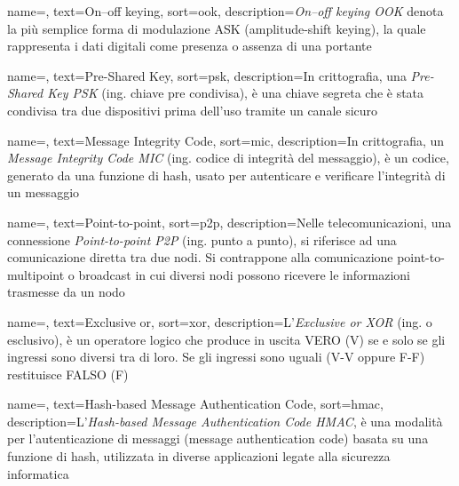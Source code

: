  {
    name=,
    text=On–off keying,
    sort=ook,
    description={\emph{On–off keying OOK} denota la più semplice forma di modulazione ASK (amplitude-shift keying), la quale rappresenta i dati digitali come presenza o assenza di una portante}
}

 {
    name=,
    text=Pre-Shared Key,
    sort=psk,
    description={In crittografia, una \emph{Pre-Shared Key PSK} (ing. chiave pre condivisa), è una chiave segreta che è stata condivisa tra due dispositivi prima dell'uso tramite un canale sicuro}
}

 {
    name=,
    text=Message Integrity Code,
    sort=mic,
    description={In crittografia, un \emph{Message Integrity Code MIC} (ing. codice di integrità del messaggio), è un codice, generato da una funzione di hash, usato per autenticare e verificare l'integrità di un messaggio}
}

 {
    name=,
    text=Point-to-point,
    sort=p2p,
    description={Nelle telecomunicazioni, una connessione \emph{Point-to-point P2P} (ing. punto a punto), si riferisce ad una comunicazione diretta tra due nodi. Si contrappone alla comunicazione point-to-multipoint o broadcast in cui diversi nodi possono ricevere le informazioni trasmesse da un nodo}
}

 {
    name=,
    text=Exclusive or,
    sort=xor,
    description={L'\emph{Exclusive or XOR} (ing. o esclusivo), è un operatore logico che produce in uscita VERO (V) se e solo se gli ingressi sono diversi tra di loro. Se gli ingressi sono uguali (V-V oppure F-F) restituisce FALSO (F)}
}

 {
    name=,
    text=Hash-based Message Authentication Code,
    sort=hmac,
    description={L'\emph{Hash-based Message Authentication Code HMAC}, è una modalità per l'autenticazione di messaggi (message authentication code) basata su una funzione di hash, utilizzata in diverse applicazioni legate alla sicurezza informatica}
}